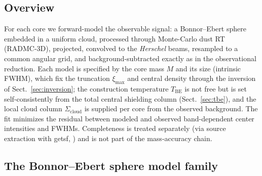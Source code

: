 \documentclass[11pt,a4paper]{article}
\newcommand{\Tbe}{T_{\mathrm{BE}}}
\newcommand{\ximax}{\xi_{\mathrm{max}}}
\newcommand{\Scloud}{\Sigma_{\mathrm{cloud}}}
\begin{document}
\subsection{Overview}

For each core we forward-model the observable signal: a Bonnor--Ebert sphere
embedded in a uniform cloud, processed through Monte-Carlo dust RT
(RADMC-3D), projected, convolved to the \emph{Herschel} beams, resampled to
a common angular grid, and background-subtracted exactly as in the
observational reduction. Each model is specified by the core mass $M$ and its
size (intrinsic FWHM), which fix the truncation $\ximax$ and central density
through the inversion of Sect.~\ref{sec:inversion}; the construction
temperature $\Tbe$ is not free but is set self-consistently from the total
central shielding column (Sect.~\ref{sec:tbe}), and the local cloud column
$\Scloud$ is supplied per core from the observed background. The fit minimizes
the residual between modeled and observed band-dependent center intensities and
FWHMs. Completeness is treated separately (via source extraction with getsf,
\citealp{Menshchikov2021method}) and is not part of the mass-accuracy chain.

\subsection{The Bonnor--Ebert sphere model family}
\end{document}
